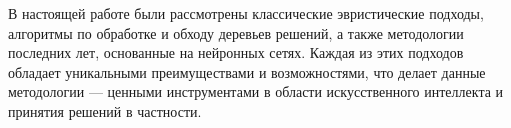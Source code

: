 В настоящей работе были рассмотрены классические эвристические подходы, алгоритмы по обработке и обходу деревьев решений, а также методологии последних лет, основанные на нейронных сетях. Каждая из этих подходов обладает уникальными преимуществами и возможностями, что делает данные методологии --- ценными инструментами в области искусственного интеллекта и принятия решений в частности.
